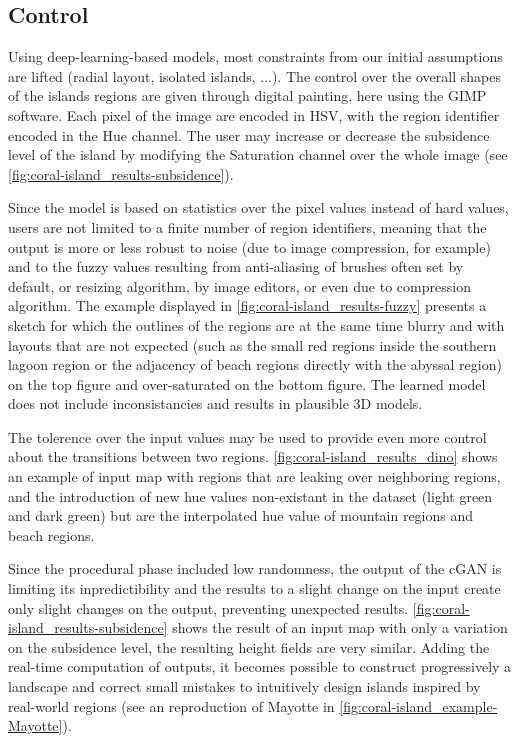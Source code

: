 \documentclass{egpubl}
\begin{document}
\subsection{Control}
\label{sec:coral-island_control}

Using deep-learning-based models, most constraints from our initial assumptions are lifted (radial layout, isolated islands, ...). The control over the overall shapes of the islands regions are given through digital painting, here using the GIMP software. Each pixel of the image are encoded in HSV, with the region identifier encoded in the Hue channel. The user may increase or decrease the subsidence level of the island by modifying the Saturation channel over the whole image (see \cref{fig:coral-island_results-subsidence}).

Since the model is based on statistics over the pixel values instead of hard values, users are not limited to a finite number of region identifiers, meaning that the output is more or less robust to noise (due to image compression, for example) and to the fuzzy values resulting from anti-aliasing of brushes often set by default, or resizing algorithm, by image editors, or even due to compression algorithm. The example displayed in \cref{fig:coral-island_results-fuzzy} presents a sketch for which the outlines of the regions are at the same time blurry and with layouts that are not expected (such as the small red regions inside the southern lagoon region or the adjacency of beach regions directly with the abyssal region) on the top figure and over-saturated on the bottom figure. The learned model does not include inconsistancies and results in plausible 3D models.

The tolerence over the input values may be used to provide even more control about the transitions between two regions. \cref{fig:coral-island_results_dino} shows an example of input map with regions that are leaking over neighboring regions, and the introduction of new hue values non-existant in the dataset (light green and dark green) but are the interpolated hue value of mountain regions and beach regions.

Since the procedural phase included low randomness, the output of the cGAN is limiting its inpredictibility and the results to a slight change on the input create only slight changes on the output, preventing unexpected results. \cref{fig:coral-island_results-subsidence} shows the result of an input map with only a variation on the subsidence level, the resulting height fields are very similar. Adding the real-time computation of outputs, it becomes possible to construct progressively a landscape and correct small mistakes to intuitively design islands inspired by real-world regions (see an reproduction of Mayotte in \cref{fig:coral-island_example-Mayotte}). 
\end{document}
